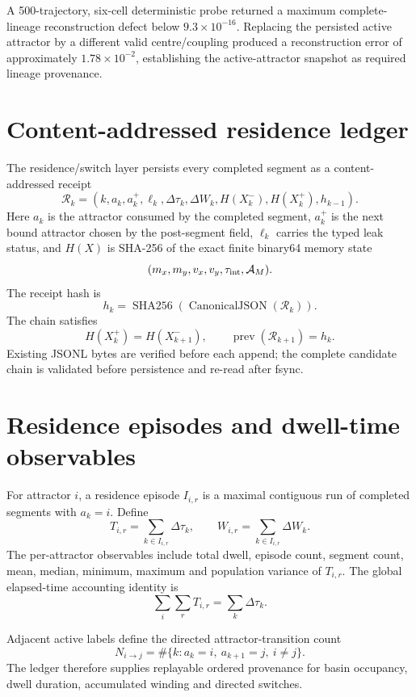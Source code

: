 A 500-trajectory, six-cell deterministic probe returned a maximum complete-lineage reconstruction defect below \(9.3\times10^{-16}\). Replacing the persisted active attractor by a different valid centre/coupling produced a reconstruction error of approximately \(1.78\times10^{-2}\), establishing the active-attractor snapshot as required lineage provenance.

\section{Content-addressed residence ledger}

The residence/switch layer persists every completed segment as a content-addressed receipt
\[
\boxed{
\mathcal R_k=
\left(
 k,a_k,a_k^+,\ell_k,
 \Delta\tau_k,\Delta W_k,
 H(X_k^-),H(X_k^+),h_{k-1}
\right).
}
\]
Here \(a_k\) is the attractor consumed by the completed segment, \(a_k^+\) is the next bound attractor chosen by the post-segment field, \(\ell_k\) carries the typed leak status, and \(H(X)\) is SHA-256 of the exact finite binary64 memory state
\[
(m_x,m_y,v_x,v_y,\tau_{\rm int},\mathcal A_M).
\]
The receipt hash is
\[
\boxed{
h_k=\operatorname{SHA256}\!\left(\operatorname{CanonicalJSON}(\mathcal R_k)\right).
}
\]
The chain satisfies
\[
\boxed{H(X_k^+)=H(X_{k+1}^-)},
\qquad
\boxed{\operatorname{prev}(\mathcal R_{k+1})=h_k.}
\]
Existing JSONL bytes are verified before each append; the complete candidate chain is validated before persistence and re-read after fsync.

\section{Residence episodes and dwell-time observables}

For attractor \(i\), a residence episode \(I_{i,r}\) is a maximal contiguous run of completed segments with \(a_k=i\). Define
\[
\boxed{
T_{i,r}=\sum_{k\in I_{i,r}}\Delta\tau_k,
}
\qquad
\boxed{
W_{i,r}=\sum_{k\in I_{i,r}}\Delta W_k.
}
\]
The per-attractor observables include total dwell, episode count, segment count, mean, median, minimum, maximum and population variance of \(T_{i,r}\). The global elapsed-time accounting identity is
\[
\boxed{
\sum_i\sum_rT_{i,r}=\sum_k\Delta\tau_k.
}
\]

Adjacent active labels define the directed attractor-transition count
\[
\boxed{
N_{i\to j}
=\#\{k:a_k=i,\ a_{k+1}=j,\ i\neq j\}.
}
\]
The ledger therefore supplies replayable ordered provenance for basin occupancy, dwell duration, accumulated winding and directed switches.

